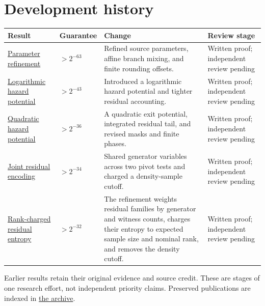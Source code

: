 \documentclass[11pt]{article}
\begin{document}
\section{Development history}\label{development-history}

{\def\LTcaptype{none} %
\begin{longtable}[]{@{}
  >{\raggedright\arraybackslash}p{}
  >{\raggedleft\arraybackslash}p{}
  >{\raggedright\arraybackslash}p{}
  >{\raggedright\arraybackslash}p{}@{}}
\toprule\noalign{}
\begin{minipage}[b]{\linewidth}\raggedright
Result
\end{minipage} & \begin{minipage}[b]{\linewidth}\raggedleft
Guarantee
\end{minipage} & \begin{minipage}[b]{\linewidth}\raggedright
Change
\end{minipage} & \begin{minipage}[b]{\linewidth}\raggedright
Review stage
\end{minipage} \\
\midrule\noalign{}
\endhead
\bottomrule\noalign{}
\endlastfoot
\href{https://github.com/shea256/matroid-prophet-inequality/blob/master/results/parameter-refinement.md}{Parameter refinement} & \(>2^{-63}\) & Refined source parameters, affine branch mixing, and finite rounding offsets. & Written proof; independent review pending \\
\href{https://github.com/shea256/matroid-prophet-inequality/blob/master/results/logarithmic-hazard.md}{Logarithmic hazard potential} & \(>2^{-43}\) & Introduced a logarithmic hazard potential and tighter residual accounting. & Written proof; independent review pending \\
\href{https://github.com/shea256/matroid-prophet-inequality/blob/master/results/quadratic-hazard.md}{Quadratic hazard potential} & \(>2^{-36}\) & A quadratic exit potential, integrated residual tail, and revised masks and finite phases. & Written proof; independent review pending \\
\href{https://github.com/shea256/matroid-prophet-inequality/blob/master/results/joint-residual.md}{Joint residual encoding} & \(>2^{-34}\) & Shared generator variables across two pivot tests and charged a density-sample cutoff. & Written proof; independent review pending \\
\href{https://github.com/shea256/matroid-prophet-inequality/blob/master/results/rank-charged.md}{Rank-charged residual entropy} & \(>2^{-32}\) & The refinement weights residual families by generator and witness counts, charges their entropy to expected sample size and nominal rank, and removes the density cutoff. & Written proof; independent review pending \\
\end{longtable}
}

Earlier results retain their original evidence and source credit. These are stages of one research effort, not independent priority claims. Preserved publications are indexed in \href{https://github.com/shea256/matroid-prophet-inequality/blob/master/archive/README.md}{the archive}.
\end{document}
